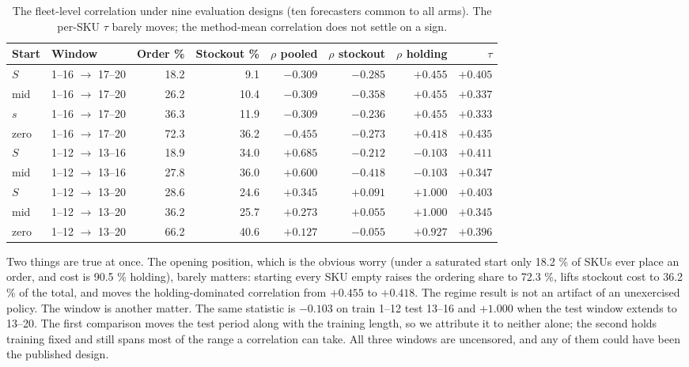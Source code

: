 \documentclass[11pt]{article}
\begin{document}
\begin{table}[htbp]
\centering
\caption{The fleet-level correlation under nine evaluation designs (ten
forecasters common to all arms). The per-SKU $\tau$ barely moves; the
method-mean correlation does not settle on a sign.}
\label{tab:fragility}
\small
\begin{tabular}{llrrrrrr}
\toprule
Start & Window & Order \% & Stockout \% & $\rho$ pooled & $\rho$ stockout & $\rho$ holding & $\tau$ \\
\midrule
$S$  & 1--16 $\to$ 17--20 & 18.2 & 9.1  & $-0.309$ & $-0.285$ & $+0.455$ & $+0.405$ \\
mid  & 1--16 $\to$ 17--20 & 26.2 & 10.4 & $-0.309$ & $-0.358$ & $+0.455$ & $+0.337$ \\
$s$  & 1--16 $\to$ 17--20 & 36.3 & 11.9 & $-0.309$ & $-0.236$ & $+0.455$ & $+0.333$ \\
zero & 1--16 $\to$ 17--20 & 72.3 & 36.2 & $-0.455$ & $-0.273$ & $+0.418$ & $+0.435$ \\
$S$  & 1--12 $\to$ 13--16 & 18.9 & 34.0 & $+0.685$ & $-0.212$ & $-0.103$ & $+0.411$ \\
mid  & 1--12 $\to$ 13--16 & 27.8 & 36.0 & $+0.600$ & $-0.418$ & $-0.103$ & $+0.347$ \\
$S$  & 1--12 $\to$ 13--20 & 28.6 & 24.6 & $+0.345$ & $+0.091$ & $+1.000$ & $+0.403$ \\
mid  & 1--12 $\to$ 13--20 & 36.2 & 25.7 & $+0.273$ & $+0.055$ & $+1.000$ & $+0.345$ \\
zero & 1--12 $\to$ 13--20 & 66.2 & 40.6 & $+0.127$ & $-0.055$ & $+0.927$ & $+0.396$ \\
\bottomrule
\end{tabular}
\end{table}

Two things are true at once. The opening position, which is the obvious worry
(under a saturated start only 18.2 \% of SKUs ever place an order, and cost is
90.5 \% holding), barely matters: starting every SKU empty raises the ordering
share to 72.3 \%, lifts stockout cost to 36.2 \% of the total, and moves the
holding-dominated correlation from $+0.455$ to $+0.418$. The regime result is
not an artifact of an unexercised policy. The window is another matter. The
same statistic is $-0.103$ on train 1--12 test 13--16 and $+1.000$ when the
test window extends to 13--20. The first comparison moves the test period
along with the training length, so we attribute it to neither alone; the
second holds training fixed and still spans most of the range a correlation
can take. All three windows are uncensored, and any of them could have been
the published design.
\end{document}

